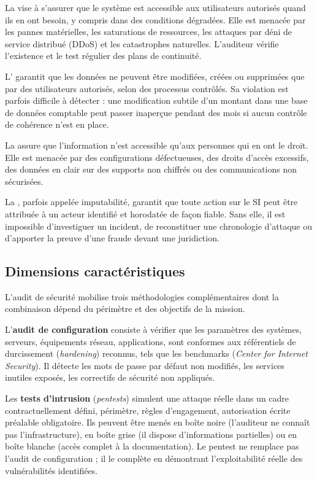 La  vise à s'assurer que le système est accessible aux utilisateurs autorisés quand ils en ont besoin, y compris dans des conditions dégradées. Elle est menacée par les pannes matérielles, les saturations de ressources, les attaques par déni de service distribué (DDoS) et les catastrophes naturelles. L'auditeur vérifie l'existence et le test régulier des plans de continuité.

L' garantit que les données ne peuvent être modifiées, créées ou supprimées que par des utilisateurs autorisés, selon des processus contrôlés. Sa violation est parfois difficile à détecter : une modification subtile d'un montant dans une base de données comptable peut passer inaperçue pendant des mois si aucun contrôle de cohérence n'est en place.

La  assure que l'information n'est accessible qu'aux personnes qui en ont le droit. Elle est menacée par des configurations défectueuses, des droits d'accès excessifs, des données en clair sur des supports non chiffrés ou des communications non sécurisées.

La , parfois appelée imputabilité, garantit que toute action sur le SI peut être attribuée à un acteur identifié et horodatée de façon fiable. Sans elle, il est impossible d'investiguer un incident, de reconstituer une chronologie d'attaque ou d'apporter la preuve d'une fraude devant une juridiction.

\subsection{Dimensions caractéristiques}

L'audit de sécurité mobilise trois méthodologies complémentaires dont la combinaison dépend du périmètre et des objectifs de la mission.

L'\textbf{audit de configuration} consiste à vérifier que les paramètres des systèmes, serveurs, équipements réseau, applications, sont conformes aux référentiels de durcissement (\textit{hardening}) reconnus, tels que les benchmarks  (\textit{Center for Internet Security}). Il détecte les mots de passe par défaut non modifiés, les services inutiles exposés, les correctifs de sécurité non appliqués.

Les \textbf{tests d'intrusion} (\textit{pentests}) simulent une attaque réelle dans un cadre contractuellement défini, périmètre, règles d'engagement, autorisation écrite préalable obligatoire. Ils peuvent être menés en boîte noire (l'auditeur ne connaît pas l'infrastructure), en boîte grise (il dispose d'informations partielles) ou en boîte blanche (accès complet à la documentation). Le pentest ne remplace pas l'audit de configuration ; il le complète en démontrant l'exploitabilité réelle des vulnérabilités identifiées.

